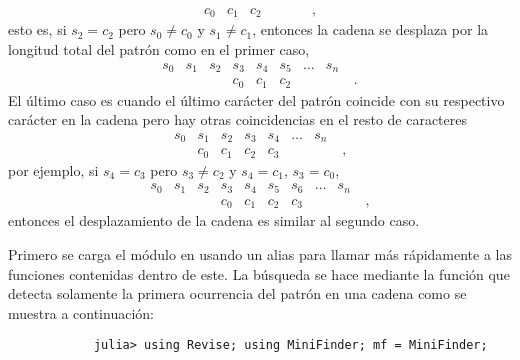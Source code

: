 \begin{itemize}
\begin{solution}
\begin{equation*}
\begin{matrix}
                c_0 & c_1 & c_2 & & \qquad ,
            \end{matrix}
        \end{equation*}
        esto es, si $s_2 = c_2$ pero $s_0 \neq c_0$ y $s_1 \neq c_1$, entonces la cadena se desplaza por la longitud total del patrón como en el primer caso,
        \begin{equation*}
            \begin{matrix}
                s_0 & s_1 & s_2 & s_3 & s_4 & s_5 & \ldots & s_n \\
                & & & c_0 & c_1 & c_2 & & \qquad .
            \end{matrix}
        \end{equation*}
        El último caso es cuando el último carácter del patrón coincide con su respectivo carácter en la cadena pero hay otras coincidencias en el resto de caracteres
        \begin{equation*}
            \begin{matrix}
                s_0 & s_1 & s_2 & s_3 & s_4 & \ldots & s_n \\
                & c_0 & c_1 & c_2 & c_3 & & \qquad ,
            \end{matrix}
        \end{equation*}
        por ejemplo, si $s_4 = c_3$ pero $s_3 \neq c_2$ y $s_4 = c_1$, $s_3 = c_0$,
        \begin{equation*}
            \begin{matrix}
                s_0 & s_1 & s_2 & s_3 & s_4 & s_5 & s_6 & \ldots & s_n \\
                & & & c_0 & c_1 & c_2 & c_3 & & \qquad ,
            \end{matrix}
        \end{equation*}
        entonces el desplazamiento de la cadena es similar al segundo caso.

        Primero se carga el módulo  en  usando un alias para llamar más rápidamente a las funciones contenidas dentro de este. La búsqueda se hace mediante la función  que detecta solamente la primera ocurrencia del patrón en una cadena como se muestra a continuación: 
        \begin{verbatim}
            julia> using Revise; using MiniFinder; mf = MiniFinder;


\end{verbatim}
\end{solution}
\end{itemize}

